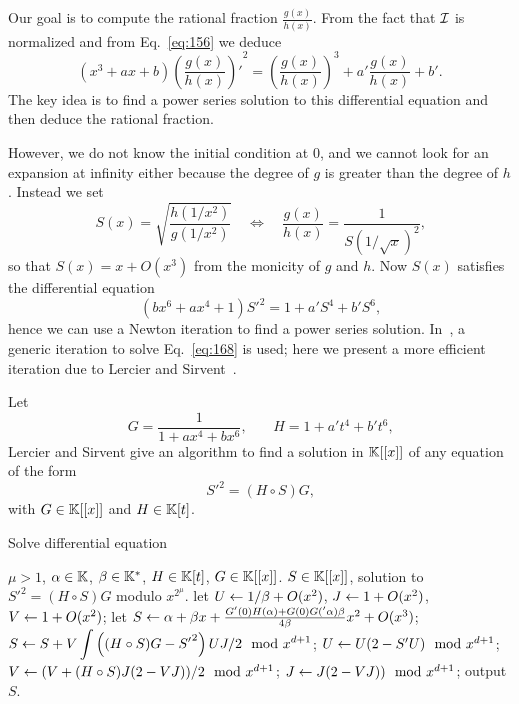 Our goal is to compute the rational fraction $\frac{g(x)}{h(x)}$. From
the fact that $\mathcal{I}$ is normalized and from Eq.~\eqref{eq:156} we deduce
\begin{equation}
  \label{eq:166}
  (x^3 + ax + b){\left(\frac{g(x)}{h(x)}\right)'}^2 =
  \left(\frac{g(x)}{h(x)}\right)^3 + a'\frac{g(x)}{h(x)} + b'
  \text{.}
\end{equation}
The key idea is to find a power series solution to this differential
equation and then deduce the rational fraction.

However, we do not know the initial condition at $0$, and we cannot
look for an expansion at infinity either because the degree of $g$ is
greater than the degree of $h$.  Instead we set
\begin{equation}
  \label{eq:167}
  S(x) = \sqrt{\frac{h(1/x^2)}{g(1/x^2)}}
  \quad\Leftrightarrow\quad
  \frac{g(x)}{h(x)} = \frac{1}{S(1/\sqrt{x})^2}
  \text{,}
\end{equation}
so that $S(x) = x + O(x^3)$ from the monicity of $g$ and $h$. Now
$S(x)$ satisfies the differential equation
\begin{equation}
  \label{eq:168}
  (bx^6 + ax^4 + 1){S'}^2 = 1 + a'S^4 + b'S^6
  \text{,}
\end{equation}
hence we can use a Newton iteration to find a power series
solution. In~\cite[2.4]{bostan+morain+salvy+schost08}, a generic
iteration to solve Eq.~\eqref{eq:168} is used; here we present a more
efficient iteration due to Lercier and
Sirvent~\cite{lercier+sirvent08}.

Let 
\begin{equation}
  \label{eq:169}
  G = \frac{1}{1 + ax^4 + bx^6}
  \text{,}\qquad
  H = 1 + a't^4 + b't^6
  \text{,}
\end{equation}
Lercier and Sirvent give an algorithm to find a solution in $\mathbb{K}[[x]]$
of any equation of the form
\begin{equation}
  \label{eq:170}
  {S'}^2 = (H\circ S)G
  \text{,}
\end{equation}
with $G\in\mathbb{K}[[x]]$ and $H\in\mathbb{K}[t]$.


\begin{algorithm}
  \caption{\label{alg:le-si-diff} Solve differential equation}
  \begin{algorithmic}[1]
    \REQUIRE $\mu>1$, $\alpha\in\mathbb{K}$, $\beta\in\mathbb{K}^\ast$, $H\in\mathbb{K}[t]$, $G\in\mathbb{K}[[x]]$.
    \ENSURE $S\in\mathbb{K}[[x]]$, solution to ${S'}^2=(H\circ S)G$ modulo $x^{2^\mu}$.
    \STATE let $U \leftarrow 1/\beta +O(x^2)$, $J \leftarrow 1 + O(x^2)$, $V \leftarrow 1 + O(x^2)$;
    \STATE let $S \leftarrow \alpha + \beta x +  \frac{G'(0)H(\alpha) + G(0)G('\alpha)\beta}{4\beta}x^2+O(x^3)$;
    \STATE \label{alg:le-si-diff:int}$S \leftarrow S + V\displaystyle\int\left((H\circ S)G - {S'}^2\right)UJ/2 \mod x^{d+1}$;
    \STATE $U \leftarrow U(2 - S' U) \mod x^{d+1}$;
    \STATE $V \leftarrow (V +  (H\circ S) J (2 - VJ))/2 \mod x^{d+1}$;
    \STATE $J \leftarrow J(2-VJ)) \mod x^{d+1}$;
    \ENDFOR
    \STATE output $S$.
  \end{algorithmic}
\end{algorithm}

